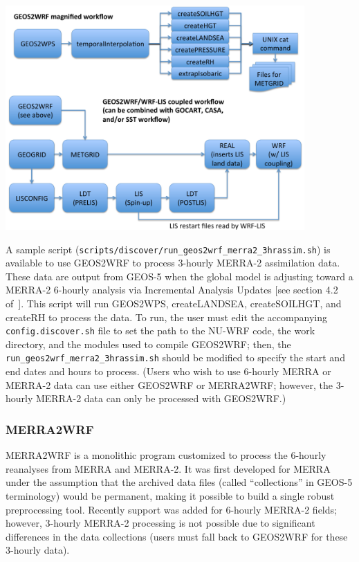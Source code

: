 \centerline{\includegraphics[width=4.5in]{GEOS_workflow}}

A sample script (\texttt{scripts/discover/run\_geos2wrf\_merra2\_3hrassim.sh}) 
is available to use GEOS2WRF to process 3-hourly MERRA-2 assimilation data.
These data are output from GEOS-5 when the global model is adjusting 
toward a MERRA-2 6-hourly analysis via Incremental Analysis Updates [see 
section 4.2 of~\cite{ref:RieneckerEtAl2008}]. This script will run GEOS2WPS,
createLANDSEA, createSOILHGT, and createRH to process the data. To run,
the user must edit the accompanying \texttt{config.discover.sh} file to set the
path to the NU-WRF code, the work directory, and the modules used to
compile GEOS2WRF; then, the \texttt{run\_geos2wrf\_merra2\_3hrassim.sh} should
be modified to specify the start and end dates and hours to process. (Users
who wish to use 6-hourly MERRA or MERRA-2 data can use either GEOS2WRF or
MERRA2WRF; however, the 3-hourly MERRA-2 data can only be processed with 
GEOS2WRF.)

\subsubsection{MERRA2WRF}
\label{subsec:MerraWorkflow}

MERRA2WRF is a monolithic program customized to process the 6-hourly
reanalyses from MERRA and MERRA-2. It was first developed for MERRA under the
assumption that the archived data files (called ``collections'' in GEOS-5
terminology) would be permanent, making it possible to build a single robust
preprocessing tool. Recently support was added for 6-hourly MERRA-2 fields;
however, 3-hourly MERRA-2 processing is not possible due to significant 
differences in the data collections (users must fall back to GEOS2WRF for 
these 3-hourly data).

